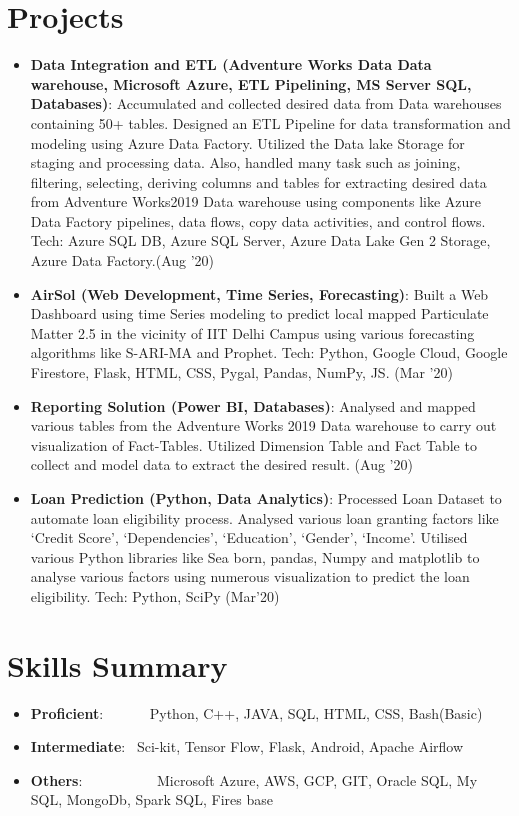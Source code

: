 \documentclass[a4paper,20pt]{article}
\newcommand{\resumeItem}[2]{
  \item\small{
    \textbf{#1}{: #2 \vspace{-2pt}}
  }
}
\newcommand{\resumeSubItem}[2]{\resumeItem{#1}{#2}\vspace{-3pt}}
\newcommand{\resumeSubHeadingListStart}{\begin{itemize}[leftmargin=*]}
\newcommand{\resumeSubHeadingListEnd}{\end{itemize}}
\begin{document}
\section{Projects}
\resumeSubHeadingListStart
\resumeSubItem{Data Integration and ETL (Adventure Works Data Data warehouse, Microsoft Azure, ETL Pipelining, MS Server SQL, Databases)}{Accumulated and collected desired data from Data warehouses containing 50+ tables. Designed an ETL Pipeline for data transformation and modeling using Azure Data Factory. Utilized the Data lake Storage for staging and processing data. Also, handled many task such as joining, filtering, selecting, deriving columns and tables for extracting desired data from Adventure Works2019 Data warehouse using components like Azure Data Factory pipelines, data flows, copy data activities, and control flows. Tech: Azure SQL DB, Azure SQL Server, Azure Data Lake Gen 2 Storage, Azure Data Factory.(Aug ’20)}
\vspace{2pt}
\resumeSubItem{AirSol (Web Development, Time Series, Forecasting)}{Built a Web Dashboard using time Series modeling to predict local mapped Particulate Matter 2.5 in the vicinity of IIT Delhi Campus using various forecasting algorithms like S-ARI-MA and Prophet. Tech: Python, Google Cloud, Google Firestore, Flask, HTML, CSS, Pygal, Pandas, NumPy, JS. (Mar '20)}
\vspace{2pt}
\resumeSubItem{Reporting Solution (Power BI, Databases)}{Analysed and mapped various tables from the Adventure Works 2019 Data warehouse to carry out visualization of Fact-Tables. Utilized Dimension Table and Fact Table to collect and model data to extract the desired result. (Aug ’20)}
\vspace{2pt}
\resumeSubItem{Loan Prediction (Python, Data Analytics)}{Processed Loan Dataset to automate loan eligibility process. Analysed various loan granting factors like `Credit Score', `Dependencies', `Education', `Gender', `Income'. Utilised various Python libraries like Sea born, pandas, Numpy and matplotlib to analyse various factors using numerous visualization to predict the loan eligibility. Tech: Python, SciPy (Mar'20)}
\resumeSubHeadingListEnd
\vspace{-5pt}


\section{Skills Summary}
	\resumeSubHeadingListStart
	\resumeSubItem{Proficient}{~~~~~~Python, C++, JAVA, SQL, HTML, CSS, Bash(Basic)}
	\resumeSubItem{Intermediate}{~Sci-kit, Tensor Flow, Flask, Android, Apache Airflow}
	\resumeSubItem{Others}{~~~~~~~~~~Microsoft Azure, AWS, GCP, GIT, Oracle SQL, My SQL, MongoDb, Spark SQL, Fires base}
	\resumeSubHeadingListEnd
\vspace{-5pt}
\end{document}
